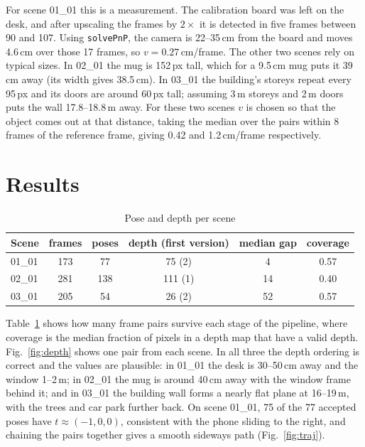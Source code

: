 \documentclass[conference]{assets/latex/IEEEtran}
\begin{document}
For scene 01\_01 this is a measurement. The calibration board was left on the desk, and after upscaling the frames by $2\times$ it is detected in five frames between 90 and 107. Using \texttt{solvePnP}, the camera is 22--35\,cm from the board and moves 4.6\,cm over those 17 frames, so $v = 0.27$\,cm/frame. The other two scenes rely on typical sizes. In 02\_01 the mug is 152\,px tall, which for a 9.5\,cm mug puts it 39\,cm away (its width gives 38.5\,cm). In 03\_01 the building's storeys repeat every 95\,px and its doors are around 60\,px tall; assuming 3\,m storeys and 2\,m doors puts the wall 17.8--18.8\,m away. For these two scenes $v$ is chosen so that the object comes out at that distance, taking the median over the pairs within 8 frames of the reference frame, giving 0.42 and 1.2\,cm/frame respectively.

\section{Results}

\begin{table}[t]
\caption{Pose and depth per scene}
\label{tab:scenes}
\centering
\setlength{\tabcolsep}{4pt}
\begin{tabular}{@{}lccccc@{}}
\toprule
Scene & frames & poses & depth (first version) & median gap & coverage \\
\midrule
01\_01 & 173 & 77 & 75 (2) & 4 & 0.57 \\
02\_01 & 281 & 138 & 111 (1) & 14 & 0.40 \\
03\_01 & 205 & 54 & 26 (2) & 52 & 0.57 \\
\bottomrule
\end{tabular}
\end{table}

Table~\ref{tab:scenes} shows how many frame pairs survive each stage of the pipeline, where coverage is the median fraction of pixels in a depth map that have a valid depth. Fig.~\ref{fig:depth} shows one pair from each scene. In all three the depth ordering is correct and the values are plausible: in 01\_01 the desk is 30--50\,cm away and the window 1--2\,m; in 02\_01 the mug is around 40\,cm away with the window frame behind it; and in 03\_01 the building wall forms a nearly flat plane at 16--19\,m, with the trees and car park further back. On scene 01\_01, 75 of the 77 accepted poses have $t \approx (-1, 0, 0)$, consistent with the phone sliding to the right, and chaining the pairs together gives a smooth sideways path (Fig.~\ref{fig:traj}).
\end{document}
